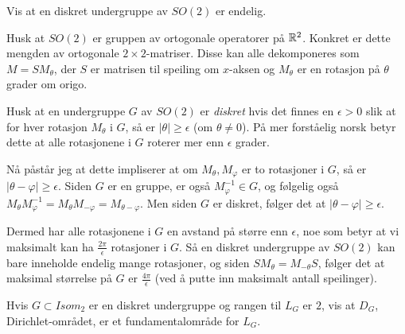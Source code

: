 \documentclass[11pt, norsk]{article}
\begin{document}
\begin{oppg}
Vis at en diskret undergruppe av $SO(2)$ er endelig.
\end{oppg}
\begin{losn}
Husk at $SO(2)$ er gruppen av ortogonale operatorer på $\mathbb{R}^2$. Konkret er dette mengden av ortogonale $2 \times 2$-matriser. Disse kan alle dekomponeres som $M=SM_\theta$, der $S$ er matrisen til speiling om $x$-aksen og $M_\theta$ er en rotasjon på $\theta$ grader om origo.

Husk at en undergruppe $G$ av $SO(2)$ er \emph{diskret} hvis det finnes en $\epsilon > 0$ slik at for hver rotasjon $M_\theta$ i $G$, så er $\lvert \theta \rvert \geq \epsilon$ (om $\theta \neq 0$). På mer forståelig norsk betyr dette at alle rotasjonene i $G$ roterer mer enn $\epsilon$ grader.

Nå påstår jeg at dette impliserer at om $M_\theta,M_\varphi$ er to rotasjoner i $G$, så er $\lvert\theta - \varphi\rvert \geq \epsilon$. Siden $G$ er en gruppe, er også $M_\varphi^{-1} \in G$, og følgelig også $M_{\theta}M_{\varphi}^{-1} = M_\theta M_{-\varphi}=M_{\theta-\varphi}$. Men siden $G$ er diskret, følger det at $\lvert \theta - \varphi\rvert \geq \epsilon$.

Dermed har alle rotasjonene i $G$ en avstand på større enn $\epsilon$, noe som betyr at vi maksimalt kan ha $\frac{2\pi}{\epsilon}$ rotasjoner i $G$. Så en diskret undergruppe av $SO(2)$ kan bare inneholde endelig mange rotasjoner, og siden $SM_\theta = M_{-\theta}S$, følger det at maksimal størrelse på $G$ er $\frac{4\pi}{\epsilon}$ (ved å putte inn maksimalt antall speilinger).
\end{losn}

\begin{oppg}
 Hvis $G \subset Isom_2$ er en diskret undergruppe og rangen til $L_G$ er $2$, vis at $D_G$, Dirichlet-området, er et fundamentalområde for $L_G$.
\end{oppg}
\end{document}
